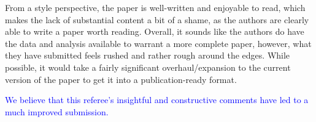 \documentclass[12pt]{article}
\begin{document}
From a style perspective, the paper is well-written and enjoyable to
read, which makes the lack of substantial content a bit of a shame, as
the authors are clearly able to write a paper worth reading. Overall,
it sounds like the authors do have the data and analysis available to
warrant a more complete paper, however, what they have submitted feels
rushed and rather rough around the edges. While possible, it would
take a fairly significant overhaul/expansion to the current version of
the paper to get it into a publication-ready format.

\textcolor{blue}{We believe that this referee's insightful and
  constructive comments have led to a much improved submission.}
\end{document}
